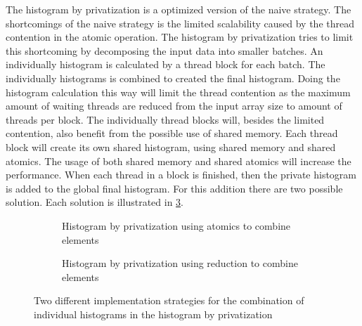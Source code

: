 The histogram by privatization is a optimized version of the naive strategy. The shortcomings of the naive strategy is the limited scalability caused by the thread contention in the atomic operation. The histogram by privatization tries to limit this shortcoming by decomposing the input data into smaller batches. An individually histogram is calculated by a thread block for each batch. The individually histograms is combined to created the final histogram. Doing the histogram calculation this way will limit the thread contention as the maximum amount of waiting threads are reduced from the input array size to amount of threads per block.
The individually thread blocks will, besides the limited contention, also benefit from the possible use of shared memory. Each thread block will create its own shared histogram, using shared memory and shared atomics. The usage of both shared memory and shared atomics will increase the performance. When each thread in a block is finished, then the private histogram is added to the global final histogram. For this addition there are two possible solution. Each solution is illustrated in \cref{fig:hist_privat}. 

\begin{figure}[ht]
	\centering
	\begin{subfigure}{0.9\textwidth}
		\centering
		\caption{Histogram by privatization using atomics to combine elements}
		\label{fig:hist_privat_atomic}
	\end{subfigure}
	\begin{subfigure}{.9\textwidth}
		\centering
		\caption{Histogram by privatization using reduction to combine elements}
		\label{fig:hist_privat_reduce}
	\end{subfigure}
	\caption{Two different implementation strategies for the combination of individual histograms in the histogram by privatization}
	\label{fig:hist_privat}
\end{figure} 

